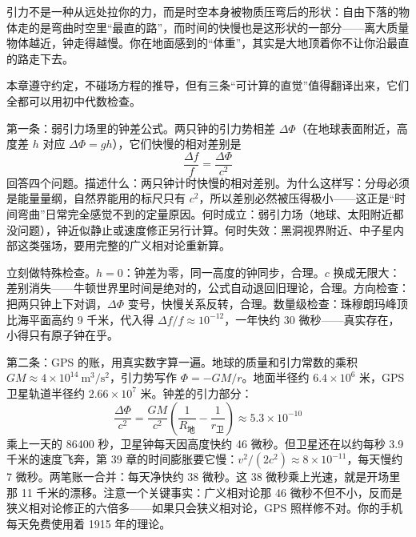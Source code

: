 
\begin{oneline}
引力不是一种从远处拉你的力，而是时空本身被物质压弯后的形状：自由下落的物体走的是弯曲时空里“最直的路”，而时间的快慢也是这形状的一部分——离大质量物体越近，钟走得越慢。你在地面感到的“体重”，其实是大地顶着你不让你沿最直的路走下去。
\end{oneline}


\begin{mainline}
本章遵守约定，不碰场方程的推导，但有三条“可计算的直觉”值得翻译出来，它们全都可以用初中代数检查。

第一条：弱引力场里的钟差公式。两只钟的引力势相差 \(\Delta\Phi\)（在地球表面附近，高度差 \(h\) 对应 \(\Delta\Phi=gh\)），它们快慢的相对差别是
\[
\frac{\Delta f}{f}=\frac{\Delta\Phi}{c^{2}}
\]
回答四个问题。描述什么：两只钟计时快慢的相对差别。为什么这样写：分母必须是能量量纲，自然界能用的标尺只有 \(c^{2}\)，所以差别必然被压得极小——这正是“时间弯曲”日常完全感觉不到的定量原因。何时成立：弱引力场（地球、太阳附近都没问题），钟近似静止或速度修正另行计算。何时失效：黑洞视界附近、中子星内部这类强场，要用完整的广义相对论重新算。

立刻做特殊检查。\(h=0\)：钟差为零，同一高度的钟同步，合理。\(c\) 换成无限大：差别消失——牛顿世界里时间是绝对的，公式自动退回旧理论，合理。方向检查：把两只钟上下对调，\(\Delta\Phi\) 变号，快慢关系反转，合理。数量级检查：珠穆朗玛峰顶比海平面高约 9 千米，代入得 \(\Delta f/f\approx10^{-12}\)，一年快约 30 微秒——真实存在，小得只有原子钟在乎。
\end{mainline}

\begin{mainline}
第二条：GPS 的账，用真实数字算一遍。地球的质量和引力常数的乘积 \(GM\approx4\times10^{14}\ \mathrm{m^{3}/s^{2}}\)，引力势写作 \(\Phi=-GM/r\)。地面半径约 \(6.4\times10^{6}\) 米，GPS 卫星轨道半径约 \(2.66\times10^{7}\) 米。钟差的引力部分：
\[
\frac{\Delta\Phi}{c^{2}}=\frac{GM}{c^{2}}\left(\frac{1}{R_{\text{地}}}-\frac{1}{r_{\text{卫}}}\right)\approx5.3\times10^{-10}
\]
乘上一天的 86400 秒，卫星钟每天因高度快约 46 微秒。但卫星还在以约每秒 3.9 千米的速度飞奔，第 39 章的时间膨胀要它慢：\(v^{2}/(2c^{2})\approx8\times10^{-11}\)，每天慢约 7 微秒。两笔账一合并：每天净快约 38 微秒。这 38 微秒乘上光速，就是开场里那 11 千米的漂移。注意一个关键事实：广义相对论那 46 微秒不但不小，反而是狭义相对论修正的六倍多——如果只会狭义相对论，GPS 照样修不对。你的手机每天免费使用着 1915 年的理论。
\end{mainline}


